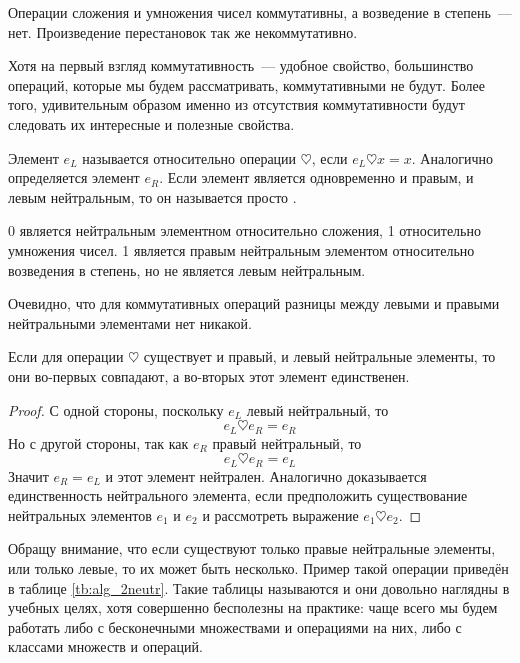 \begin{example}
Операции сложения и умножения чисел коммутативны, а возведение в степень~--- нет. Произведение перестановок так же некоммутативно.
\end{example}

Хотя на первый взгляд коммутативность~--- удобное свойство, большинство операций, которые мы будем рассматривать, коммутативными не будут. Более того, удивительным образом именно из отсутствия коммутативности будут следовать их интересные и полезные свойства.

\begin{definition}
Элемент $e_L$ называется  относительно операции $\heartsuit$, если $e_L\heartsuit x = x$. Аналогично определяется  элемент $e_R$. Если элемент является одновременно и правым, и левым нейтральным, то он называется просто .
\end{definition}

\begin{example}
0 является нейтральным элементном относительно сложения, 1 относительно умножения чисел. 1 является правым нейтральным элементом относительно возведения в степень, но не является левым нейтральным.
\end{example}

Очевидно, что для коммутативных операций разницы между левыми и правыми нейтральными элементами нет никакой.

\begin{thm}
Если для операции $\heartsuit$ существует и правый, и левый нейтральные элементы, то они во-первых совпадают, а во-вторых этот элемент единственен.
\end{thm}
\begin{proof}
С одной стороны, поскольку $e_L$ левый нейтральный, то
$$e_L\heartsuit e_R = e_R$$
Но с другой стороны, так как $e_R$ правый нейтральный, то
$$e_L\heartsuit e_R = e_L$$
Значит $e_R=e_L$ и этот элемент нейтрален. Аналогично доказывается единственность нейтрального элемента, если предположить существование нейтральных элементов $e_1$ и $e_2$ и рассмотреть выражение $e_1\heartsuit e_2$. 
\end{proof}

Обращу внимание, что если существуют только правые нейтральные элементы, или только левые, то их может быть несколько. Пример такой операции приведён в таблице \ref{tb:alg_2neutr}. Такие таблицы называются  и они довольно наглядны в учебных целях, хотя совершенно бесполезны на практике: чаще всего мы будем работать либо с бесконечными множествами и операциями на них, либо с классами множеств и операций.


